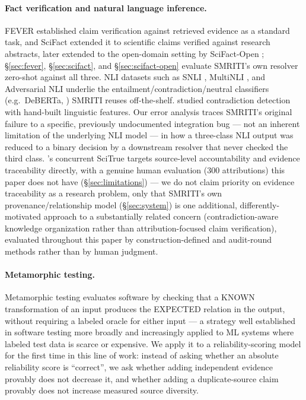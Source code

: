 \documentclass[11pt]{article}
\begin{document}
\paragraph{Fact verification and natural language inference.} FEVER
\citep{thorne2018fever} established claim verification against retrieved
evidence as a standard task, and SciFact \citep{wadden2020fact} extended
it to scientific claims verified against research abstracts, later
extended to the open-domain setting by SciFact-Open
\citep{wadden2022scifact}; \S\ref{sec:fever}, \S\ref{sec:scifact}, and
\S\ref{sec:scifact-open} evaluate SMRITI's own resolver zero-shot against
all three. NLI datasets such as SNLI
\citep{bowman2015large}, MultiNLI \citep{williams2018broad}, and Adversarial
NLI \citep{nie2020adversarial} underlie the entailment/contradiction/neutral
classifiers (e.g.\ DeBERTa, \citealp{he2021deberta}) SMRITI reuses
off-the-shelf. \citet{demarneffe2008finding} studied contradiction detection
with hand-built linguistic features. Our error analysis traces SMRITI's
original failure to a specific, previously undocumented integration bug ---
not an inherent limitation of the underlying NLI model --- in how a
three-class NLI output was reduced to a binary decision by a downstream
resolver that never checked the third class. \citet{tan-etal-2026-scitrue}'s
concurrent SciTrue targets source-level accountability and evidence
traceability directly, with a genuine human evaluation (300 attributions)
this paper does not have (\S\ref{sec:limitations}) --- we do not claim
priority on evidence traceability as a research problem, only that
SMRITI's own provenance/relationship model (\S\ref{sec:system}) is one
additional, differently-motivated approach to a substantially related
concern (contradiction-aware knowledge organization rather than
attribution-focused claim verification), evaluated throughout this paper
by construction-defined and audit-round methods rather than by human
judgment.

\paragraph{Metamorphic testing.} Metamorphic testing evaluates software by
checking that a KNOWN transformation of an input produces the EXPECTED
relation in the output, without requiring a labeled oracle for either input
--- a strategy well established in software testing more broadly and
increasingly applied to ML systems where labeled test data is scarce or
expensive. We apply it to a reliability-scoring model for the first time in
this line of work: instead of asking whether an absolute reliability score
is ``correct'', we ask whether adding independent evidence provably does
not decrease it, and whether adding a duplicate-source claim provably does
not increase measured source diversity.
\end{document}
